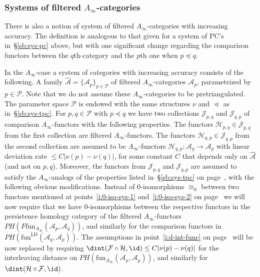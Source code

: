 \subsubsection{Systems of filtered
  $A_{\infty}$-categories} \label{sb:sys-ainfty} There is also a
notion of system of filtered $A_{\infty}$-categories with increasing
accuracy. The definition is analogous to that given for a system of
PC's in~\S\ref{sb:sys-pc} above, but with one significant change
regarding the comparison functors between the $q$th-category and the
$p$th one when $p \preceq q$.

In the $A_{\infty}$-case a system of categories with increasing
accuracy consists of the following. A family
$\widehat{\mathcal{A}} = \{\mathcal{A}_p\}_{p \in \mathcal{P}}$ of
filtered $A_{\infty}$-categories $\mathcal{A}_p$, parametrized by
$p \in \mathcal{P}$. Note that we do not assume these
$A_{\infty}$-categories to be pretriangulated. The parameter space
$\mathcal{P}$ is endowed with the same structures $\nu$ and $\preceq$
as in~\S\ref{sb:sys-tpc}. For $p, q \in \mathcal{P}$ with
$p \preceq q$ we have two collections $\mathcal{J}_{p,q}$ and
$\mathcal{J}_{q,p}$ of comparison $A_{\infty}$-functors with the
following properties. The functors
$\mathcal{H}_{p,q} \in \mathcal{J}_{p,q}$ from the first collection
are filtered $A_{\infty}$-functors. The functors
$\mathcal{H}_{q,p} \in \mathcal{J}_{q,p}$ from the second collection
are assumed to be $A_{\infty}$-functors
$\mathcal{H}_{q,p}: \mathcal{A}_q \longrightarrow \mathcal{A}_p$ with
linear deviation rate $\leq C | \nu(p) - \nu(q)|$, for some constant
$C$ that depends only on $\widehat{\mathcal{A}}$ (and not on $p,
q$). Moreover, the functors from $\mathcal{J}_{p,q}$ and
$\mathcal{J}_{q,p}$ are assumed to satisfy the $A_{\infty}$-analogs of
the properties listed in~\S\ref{sb:sys-tpc} on
page~\pageref{pp:sys-functors}, with the following obvious
modifications. Instead of $0$-isomorphisms $\cong_0$ between two
functors mentioned at points~\eqref{i:0-iso-sys-1}
and~\eqref{i:0-iso-sys-2} on page~\pageref{pp:sys-functors} we will
now require that we have $0$-isomorphisms between the respective functors in the persistence homology category of the
filtered $A_{\infty}$-functors
$PH (F\text{fun}_{A_{\infty}}(\mathcal{A}_p, \mathcal{A}_q))$, and
similarly for the comparison functors in
$PH(\text{fun}^{\text{LD}}(\mathcal{A}_q, \mathcal{A}_p))$. The
assumptions in point~\eqref{i:d-int-func} on
page~\pageref{pp:sys-functors} will be now replaced by requiring 
$\dint(\mathcal{F} \circ \mathcal{H}, \id) \leq C | \nu(p) - \nu(q)|$
for the interleaving distance on
$PH (\text{fun}_{A_{\infty}}(\mathcal{A}_p, \mathcal{A}_p))$, and
similarly for $\dint(\mathcal{H} \circ \mathcal{F}, \id)$.

